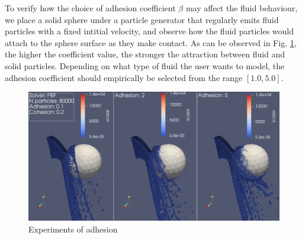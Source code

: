 \documentclass[
	11pt, 
	DIV10,
	ngerman,
	a4paper, 
	oneside, 
	headings=normal, 
	captions=tableheading,
	final, 
	numbers=noenddot
]{scrartcl}
\begin{document}
To verify how the choice of adhesion coefficient $ \beta $ may affect the fluid behaviour, we place a solid sphere under a particle generator that regularly emits fluid particles with a fixed intitial velocity, and observe how the fluid particles would attach to the sphere surface as they make contact. As can be observed in Fig. \ref{fig:wetting}, the higher the coefficient value, the stronger the attraction between fluid and solid particles. Depending on what type of fluid the user wants to model, the adhesion coefficient should empirically be selected from the range $ [1.0, 5.0] $.

\begin{figure}
    \centering
    \includegraphics[width=.6\textwidth]{pics/adhesion.png}
    \caption{Experiments of adhesion}
    \label{fig:wetting}
\end{figure}



\end{document}
